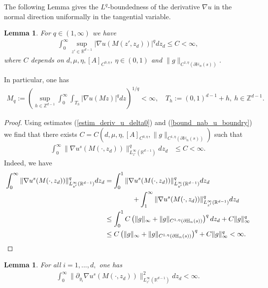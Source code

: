 \documentclass[11pt, reqno]{amsart}
\newtheorem{lemma}[theorem]{Lemma}
\theoremstyle{definition}
\theoremstyle{remark}
\numberwithin{equation}{section}
\begin{document}
\begin{appendices}
\noindent	The following Lemma gives  the  $L^q$-boundedness of the derivative $\nabla u$ in the normal direction uniformally in the tangential variable. 
\begin{lemma}\label{LinfLq}
	For $q\in(1,\infty)$ we have 
	\begin{align*}
		\int_0^\infty  \sup_{z'\in \mathbb{R}^{d-1}} | \nabla u(M(z',z_d))|^q dz_d \leq C < \infty,
	\end{align*}
	where $C$ depends on  $d,\mu,\eta, [A]_{ C^{0,\eta} }$, $\eta\in(0,1)$ and $ \| g \|_{ C^{1,\eta} (\partial{\mathbb{H}}_n(s)  ) }$.
\end{lemma}
\noindent In particular, one has 
\begin{align}\label{Mq}
	M_q:= \left( \sup_{h\in\mathbb{Z}^{d-1}}\int_0^\infty  \!\!\!\! \int_{T_h} |\nabla u(Mz)|^q dz \right)^{\!\!\!1/q} <\infty , \quad  T_h:= (0,1)^{d-1}+h, \ h\in\mathbb{Z}^{d-1}.
\end{align}
\begin{proof}
	\noindent	Using estimates (\ref{estim_deriv_u_delta0}) and (\ref{bound_nab_u_boundry}) we find that there exists $C=C(d,\mu,\eta, [A]_{C^{0,\eta}},  \| g \|_{ C^{1,\eta} (\partial{\mathbb{H}}_n(s)  ) } )$ such that
	\begin{align}
		\int_{0}^\infty  \| \nabla u^s(M (\cdot,z_d))\|^q_{L_{z'}^\infty(\mathbb{R}^{d-1})} dz_d
		&\leq  C  <\infty . \label{L^2_nab_u}
	\end{align}
	Indeed, we have
	\begin{align*}
		\int_{0}^\infty  \| \nabla u^s(M (\cdot,z_d))\|^q_{L_{z'}^\infty(\mathbb{R}^{d-1})} dz_d &=  	\int_{0}^1 \| \nabla u^s(M (\cdot,z_d))\|^q_{L_{z'}^\infty(\mathbb{R}^{d-1})} dz_d\\ &\qquad\qquad+	\int_{1}^\infty  \| \nabla u^s(M (\cdot,z_d))\|^q_{L_{z'}^\infty(\mathbb{R}^{d-1})} dz_d \\
		&	\leq \int_{0}^1  C\left( \| g \|_{\infty} + \| g \|_{ C^{1,\eta}(\partial\mathbb{H}_n(s) ) } \right)^q dz_d+C \| g \|^q_{\infty} \\
		&\leq  C\left( \| g \|_{\infty}+ \| g \|_{ C^{1,\eta}(\partial\mathbb{H}_n(s) ) } \right)^q +C \| g \|^q_{\infty} <\infty . \qedhere\\
	\end{align*}
\end{proof}








\begin{lemma}\label{deriv2_L2}
	For all $i=1,...,d,$ one has 	\begin{align*}
		\int_{0}^\infty  \|\partial_{y_i}  \nabla u^s(M (\cdot,z_d))\|^2_{L_{z'}^\infty(\mathbb{R}^{d-1})} dz_d<\infty.
	\end{align*}
\end{lemma}


\end{appendices}
\end{document}
